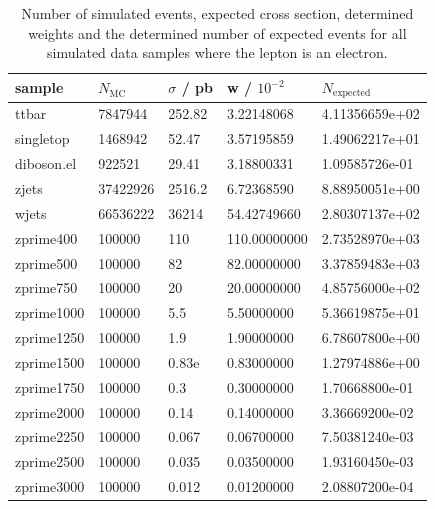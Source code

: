 \begin{table}[H]
  \centering
  \begin{tabular}{l|llll}
      sample           &  $N_\text{MC}$  & $\sigma$ / pb & w / $10^{-2}$& $N_\text{expected}$ \\
      \hline
      ttbar      & 7847944    & 252.82    &    3.22148068   &     4.11356659e+02       \\
      singletop  & 1468942    & 52.47     &    3.57195859   &     1.49062217e+01       \\
      diboson.el & 922521     & 29.41     &    3.18800331   &     1.09585726e-01       \\
      zjets      & 37422926   & 2516.2    &    6.72368590   &     8.88950051e+00       \\
      wjets      & 66536222   & 36214     &   54.42749660   &     2.80307137e+02       \\
      zprime400  & 100000     & 110       &  110.00000000   &     2.73528970e+03       \\
      zprime500  & 100000     & 82        &   82.00000000   &     3.37859483e+03       \\
      zprime750  & 100000     & 20        &   20.00000000   &     4.85756000e+02       \\
      zprime1000 & 100000     & 5.5       &    5.50000000   &     5.36619875e+01       \\
      zprime1250 & 100000     & 1.9       &    1.90000000   &     6.78607800e+00       \\
      zprime1500 & 100000     & 0.83e     &    0.83000000   &     1.27974886e+00       \\
      zprime1750 & 100000     & 0.3       &    0.30000000   &     1.70668800e-01       \\
      zprime2000 & 100000     & 0.14      &    0.14000000   &     3.36669200e-02       \\
      zprime2250 & 100000     & 0.067     &    0.06700000   &     7.50381240e-03       \\
      zprime2500 & 100000     & 0.035     &    0.03500000   &     1.93160450e-03       \\
      zprime3000 & 100000     & 0.012     &    0.01200000   &     2.08807200e-04       \\
      \end{tabular}
\caption{Number of simulated events, expected cross section, determined weights and the determined number of expected events for all simulated
data samples where the lepton is an electron.}
\label{tab:agree}

  \end{table}

